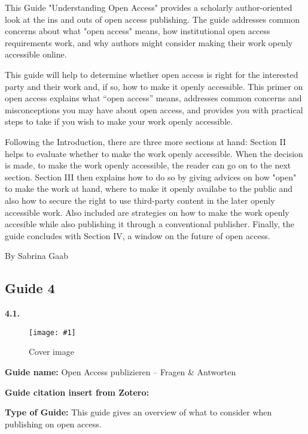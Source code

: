 \documentclass{article}
\newlength{\imgwidth}
\newcommand\scaledgraphics[2]{%
                
\settowidth{\imgwidth}{\texttt{[image: \#1]}}%
                
\setlength{\imgwidth}{\minof{\imgwidth}{#2\textwidth}}%
                
\texttt{[image: \#1]}%
                
}
\begin{document}
This Guide "Understanding Open Access" provides a scholarly author-oriented look at the ins and outs of open access publishing. The guide addresses common concerns about what "open access" means, how institutional open access requirements work, and why authors might consider making their work openly accessible online. 


This guide will help to determine whether open access is right for the interested party and their work and, if so, how to make it openly accessible. This primer on open access explains what “open access” means, addresses common concerns and misconceptions you may have about open access, and provides you with practical steps to take if you wish to make your work openly accessible.


Following the Introduction, there are three more sections at hand: Section II helps to evaluate whether to make the work openly accessible. When the decision is made, to make the work openly accessible, the reader can go on to the next section. Section III then explains how to do so by giving advices on how "open" to make the work at hand, where to make it openly availabe to the public and also how to secure the right to use third-party content in the later openly accessible work. Also included are strategies on how to make the work openly accesible while also publishing it through a conventional publisher.  Finally, the guide concludes with Section IV, a window on the future of open access.


By Sabrina Gaab 


\subsection{Guide 4}\label{H4741497}



\textbf{4.1.} 


\begin{center}
\begin{figure}
\scaledgraphics{d3486e9b-9c03-4ba9-9211-5ee2eb18125f.jpg}{0.5}
\caption*{Cover image}\label{F61436691}
\end{figure}


\end{center}


\textbf{Guide name:} Open Access publizieren – Fragen \& Antworten


\textbf{Guide citation insert from Zotero: }\autocite{bundesministerium_fur_bildung_und_forschung_open_2021}


\textbf{Type of Guide: } This guide gives an overview of what to consider when publishing on open access.
\end{document}

